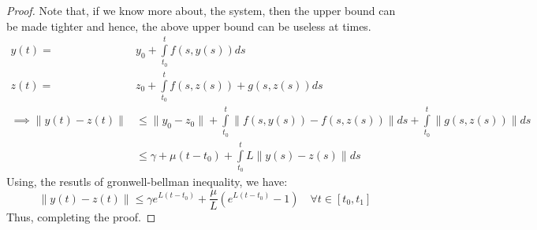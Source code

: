 \begin{proof}
    Note that, if we know more about, the system, then the upper bound can be made tighter and hence, the above upper 
    bound can be useless at times.
    \[
        \begin{aligned}
            y(t) = &y_0 + \int\limits_{t_0}^{t} f(s,y(s)) ds \\
            z(t) = &z_0 + \int\limits_{t_0}^{t} f(s,z(s)) + g(s,z(s)) ds\\
            \implies \lVert y(t) - z(t) \rVert &\leq \lVert y_0 - z_0 \rVert + 
            \int\limits_{t_0}^{t} \lVert f(s,y(s)) - f(s,z(s)) \rVert ds + \int\limits_{t_0}^{t} \lVert g(s,z(s)) \rVert ds\\
            & \leq \gamma  + \mu (t-t_0) + \int\limits_{t_0}^{t} L \lVert y(s) - z(s) \rVert ds
        \end{aligned}
    \]
    Using, the resutls of gronwell-bellman inequality, we have:
    \[
        \lVert y(t) - z(t) \rVert \leq \gamma e^{L(t-t_0)} + \frac{\mu}{L} \left( e^ {L(t-t_0)} - 1\right) 
        \quad \forall t \in [t_0,t_1]  
    \]
    Thus, completing the proof.
\end{proof}
